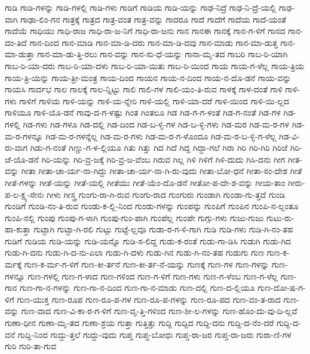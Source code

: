 {ಗಾಡಿ
ಗಾಡಿ-ಗಳನ್ನು
ಗಾಡಿ-ಗಳಲ್ಲಿ
ಗಾಡಿ-ಗಳು
ಗಾಡಿಗೆ
ಗಾಡಿಯ
ಗಾಡಿ-ಯನ್ನು
ಗಾಢ-ನಿದ್ರೆ
ಗಾಢ-ನಿ-ದ್ರೆ-ಯಲ್ಲಿ
ಗಾಢ-ವಾಗಿ
ಗಾಢಾ-ಲಿಂ-ಗನ
ಗಾತ್ರಕ್ಕೆ
ಗಾತ್ರದ
ಗಾತ್ರ-ವಂತ
ಗಾತ್ರ-ವನ್ನು
ಗಾದರೂ
ಗಾದೆ
ಗಾದೆಗೆ
ಗಾದೆಯ
ಗಾದೆ-ಯಂತೆ
ಗಾದೆಯೆ
ಗಾಧಿಯು
ಗಾಧಿ-ರಾಜ
ಗಾಧಿ-ರಾ-ಜ-ನಿಗೆ
ಗಾಧಿ-ರಾ-ಜನು
ಗಾನ
ಗಾನಈ
ಗಾನಕ್ಕೆ
ಗಾನ-ಗ-ಳಿಗೆ
ಗಾನದ
ಗಾನ-ದಂ-ತಿದೆ
ಗಾನ-ದಿಂದ
ಗಾನ-ಮಾಡಿ
ಗಾನ-ಮಾ-ಡಿ-ದರು
ಗಾನ-ಮಾ-ಡಿ-ದವು
ಗಾನ-ಮಾಡು
ಗಾನ-ಮಾ-ಡುತ್ತ
ಗಾನ-ಮಾ-ಡುತ್ತಾ
ಗಾನ-ಮಾ-ಡು-ತ್ತಿ-ರಲು
ಗಾನ-ವನ್ನು
ಗಾನ-ಸು-ಧೆ-ಯನ್ನು
ಗಾನಾ-ಮೃ-ತದ
ಗಾಬರಿ
ಗಾಬ-ರಿ-ಯಾಗಿ
ಗಾಬ-ರಿ-ಯಾ-ದರು
ಗಾಬ-ರಿ-ಯಾ-ದಳು
ಗಾಬ-ರಿ-ಯಾ-ಯಿತು
ಗಾಬ-ರಿ-ಯಿಂದ
ಗಾಯ
ಗಾಯ-ಗ-ಳೆಲ್ಲ
ಗಾಯ-ತ್ರಿಯ
ಗಾಯ-ತ್ರಿ-ಯನ್ನು
ಗಾಯ-ತ್ರೀ-ಮಂತ್ರ
ಗಾಯ-ದಿಂದ
ಗಾಯನ
ಗಾಯ-ನ-ದಿಂದ
ಗಾಯ-ನ-ದೊ-ಡನೆ
ಗಾಯ-ವನ್ನು
ಗಾಯಸಿ
ಗಾರ್ದಭ
ಗಾಲ
ಗಾಲಕ್ಕೆ
ಗಾಲ-ನ್ನಿಟ್ಟು
ಗಾಲಿ
ಗಾಲಿ-ಗಳ
ಗಾಲಿ-ಯಂ-ತಿ-ರುವ
ಗಾಳಕ್ಕೆ
ಗಾಳ-ದಂತೆ
ಗಾಳಿ
ಗಾಳಿ-ಗಳು
ಗಾಳಿಗೆ
ಗಾಳಿಯ
ಗಾಳಿ-ಯನ್ನು
ಗಾಳಿ-ಯ-ನ್ನೇರಿ
ಗಾಳಿ-ಯಲ್ಲಿ
ಗಾಳಿ-ಯಾ-ದರೆ
ಗಾಳಿ-ಯಿಂದ
ಗಾಳಿ-ಯಿ-ಲ್ಲದ
ಗಾಳಿಯೂ
ಗಾಳಿ-ಯೊ-ಡನೆ
ಗಾವು-ದ-ಗ-ಳಷ್ಟು
ಗಿಂತ
ಗಿಂತಲೂ
ಗಿಡ
ಗಿಡ-ಗ-ಗ-ಳಂತೆ
ಗಿಡ-ಗ-ನಂತೆ
ಗಿಡ-ಗಳ
ಗಿಡ-ಗಳಲ್ಲಿ
ಗಿಡ-ಗಳು
ಗಿಡ-ಗಳೂ
ಗಿಡ-ದಲ್ಲಿ
ಗಿಡ-ದಿಂದ
ಗಿಡ-ಬ-ಳ್ಳಿ-ಗಳ
ಗಿಡ-ಬ-ಳ್ಳಿ-ಗಳು
ಗಿಡ-ಮರ
ಗಿಡ-ಮ-ರ-ಗಳ
ಗಿಡ-ಮ-ರ-ಗಳನ್ನೂ
ಗಿಡ-ಮ-ರ-ಗಳನ್ನೆಲ್ಲ
ಗಿಡ-ಮ-ರ-ಗಳು
ಗಿಡ-ಮ-ರ-ಗ-ಳೊಂದೂ
ಗಿಡ-ಮ-ರ-ಬ-ಳ್ಳಿ-ಗ-ಳೆಲ್ಲ
ಗಿಡ-ವಿ-ರು-ವಾಗ
ಗಿಡು-ಗ-ನಂತೆ
ಗಿಣ್ಣು-ಗ-ಳ-ಲ್ಲಿಯೂ
ಗಿತು
ಗಿತ್ತು
ಗಿದ
ಗಿದೆ
ಗಿದ್ದ
ಗಿದ್ದಾ-ಗಲೆ
ಗಿರಾ
ಗಿರಿ
ಗಿರಿ-ಗಿರಿ
ಗಿರಿಜೆ
ಗಿರಿ-ಜೆ-ಯೊ-ಡನೆ
ಗಿರಿ-ಯನ್ನು
ಗಿರಿ-ವ್ರ-ಜಕ್ಕೆ
ಗಿರಿ-ವ್ರ-ಜ-ವೆಂಬ
ಗಿರುವ
ಗಿಲ್ಲ
ಗಿಳಿ
ಗಿಳಿಗೆ
ಗಿಳಿ-ದುದು
ಗಿಸಿ-ದನು
ಗೀಗ
ಗೀತ-ವನ್ನು
ಗೀತಾ
ಗೀತಾ-ಚಾ-ರ್ಯ-ನಾ-ಗಿದ್ದು
ಗೀತಾ-ಚಾ-ರ್ಯ-ನಾ-ಗಿ-ರು-ವುದು
ಗೀತಾ-ಬೋ-ಧನೆ
ಗೀತಾ-ಸಂ-ದೇಶ
ಗೀತೆ
ಗೀತೆ-ಗಳನ್ನು
ಗೀತೆ-ಯನ್ನು
ಗೀತೆ-ಯಲ್ಲಿ
ಗೀತೆಯು
ಗೀತೆ-ಯೆಂ-ದೊ-ಡನೆ
ಗೀತೋ-ಪ-ದೇ-ಶ-ವನ್ನು
ಗೀಯ-ತಾಂ
ಗೀರು-ಪ-ಲ-ಕ್ಷ್ಯ-ಸೇನಃ
ಗೀಳು
ಗೀಸ್ತ್ರ
ಗುಂಗು-ರಾ-ಗಿ-ರುವ
ಗುಂಗು-ರಾದ
ಗುಂಗುರು
ಗುಂಡಾಗಿ
ಗುಂಡಾ-ಗು-ತ್ತದೆ
ಗುಂಡಿ
ಗುಂಡಿಗೆ
ಗುಂಡಿ-ನಂ-ತಿ-ರುವ
ಗುಂಡು-ಕ-ಲ್ಲಿ-ನಿಂದ
ಗುಂಡು-ಗಳನ್ನು
ಗುಂಪನ್ನು
ಗುಂಪಿಗೆ
ಗುಂಪಿನ
ಗುಂಪಿ-ನ-ಲ್ಲಂತೂ
ಗುಂಪಿ-ನಲ್ಲಿ
ಗುಂಪು
ಗುಂಪು-ಗ-ಳಾಗಿ
ಗುಂಪು-ಗುಂ-ಪಾಗಿ
ಗುಂಪೆಲ್ಲ
ಗುಂಪೇ
ಗುಗ್ಗು-ಗಳು
ಗುಜು-ಗುಜು
ಗುಟು-ರು-ಹಾ-ಕುತ್ತಾ
ಗುಟ್ಟಾಗಿ
ಗುಟ್ಟಾ-ಗಿ-ರಲಿ
ಗುಟ್ಟು
ಗುಟ್ಟೆ-ಲ್ಲವೂ
ಗುಡಾ-ರ-ಗ-ಳಿ-ಗಾಗಿ
ಗುಡಿ
ಗುಡಿ-ಗಳು
ಗುಡಿ-ಗಿ-ನಂ-ತಹ
ಗುಡಿಗೆ
ಗುಡಿಯ
ಗುಡಿ-ಯನ್ನು
ಗುಡಿ-ಯನ್ನೊ
ಗುಡಿ-ಸ-ಲಿದ್ದ
ಗುಡು-ಕ-ರಂತೆ
ಗುಡು-ಗಾ-ಡಿಸಿ
ಗುಡುಗಿ
ಗುಡು-ಗಿದ
ಗುಡು-ಗಿ-ದನು
ಗುಡು-ಗಿ-ದ-ನು-ಎಲಾ
ಗುಡು-ಗಿ-ದಳು
ಗುಡು-ಗಿನ
ಗುಡು-ಗಿ-ನಂ-ತಹ
ಗುಡುಗು
ಗುಣ
ಗುಣ-ಕ-ರ್ಮಕ್ಕೆ
ಗುಣ-ಕ-ರ್ಮ-ಗ-ಳಿಗೆ
ಗುಣ-ಕೀ-ರ್ತನೆ
ಗುಣ-ಕೀ-ರ್ತ-ನೆ-ಯನ್ನು
ಗುಣಕ್ಕೆ
ಗುಣ-ಗಳ
ಗುಣ-ಗಳನ್ನು
ಗುಣ-ಗಳನ್ನೂ
ಗುಣ-ಗಳಲ್ಲಿ
ಗುಣ-ಗ-ಳಾದ
ಗುಣ-ಗಳಿಂದ
ಗುಣ-ಗ-ಳಿಗೆ
ಗುಣ-ಗಳು
ಗುಣ-ಗ-ಳೆಂಬ
ಗುಣ-ಗ-ಳೆಲ್ಲ
ಗುಣ-ಗಾನ
ಗುಣ-ಗಾ-ನ-ಗಳನ್ನು
ಗುಣ-ಗಾ-ನ-ದಿಂದ
ಗುಣ-ಗಾ-ನ-ಮಾಡು
ಗುಣ-ದಲ್ಲಿ
ಗುಣ-ದ-ಲ್ಲಿಯೂ
ಗುಣ-ದೋ-ಷ-ಗ-ಳಿಗೆ
ಗುಣ-ಯುಕ್ತ
ಗುಣ-ರೂಪ
ಗುಣ-ರೂ-ಪ-ಗಳ
ಗುಣ-ರೂ-ಪ-ಗಳನ್ನು
ಗುಣ-ರೂ-ಪದ
ಗುಣ-ವಂ-ತ-ರಾದ
ಗುಣ-ವನ್ನು
ಗುಣ-ವಾದ
ಗುಣ-ವಿ-ಕಾ-ರ-ಗ-ಳಿಗೆ
ಗುಣ-ವೃ-ತ್ತಿ-ಗಳಿಂದ
ಗುಣ-ಶೀ-ಲ-ಗಳನ್ನು
ಗುಣ-ಹೊಂ-ದು-ವು-ದಿ-ಲ್ಲವೆ
ಗುಣಾ-ಧೀನ
ಗುಣಾ-ಮೃ-ತದ
ಗುಣಾ-ಶ್ರಯ
ಗುತ್ತಾ
ಗುತ್ತಿತ್ತು
ಗುದ್ದಿ
ಗುದ್ದಿದ
ಗುದ್ದಿ-ದನು
ಗುದ್ದಿ-ದ-ನೆಂ-ದರೆ
ಗುದ್ದಿ-ದ-ವನೆ
ಗುದ್ದಿ-ನಿಂದ
ಗುದ್ದು-ತ್ತಲೆ
ಗುದ್ದು-ವುದು
ಗುಪ್ತ
ಗುಪ್ತ-ಬೋಧಃ
ಗುಪ್ತ-ರಾ-ಜರ
ಗುಪ್ತ-ರಾ-ಜರು
ಗುರಾ-ಣಿ-ಗಳ
ಗುರಿ
ಗುರಿ-ತಾ-ಗುವ
}
